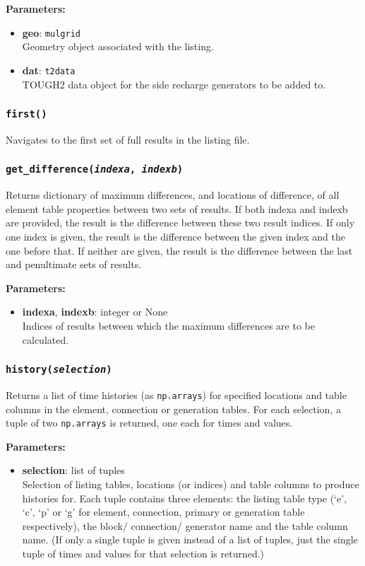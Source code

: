 \textbf{Parameters:}
\begin{itemize}
\item \textbf{geo}: \texttt{mulgrid}\\
  Geometry object associated with the listing.
\item \textbf{dat}: \texttt{t2data}\\
  TOUGH2 data object for the side recharge generators to be added to.
\end{itemize}

\subsubsection{\texttt{first()}}

Navigates to the first set of full results in the listing file.

\subsubsection{\texttt{get\_difference(\emph{indexa}, \emph{indexb})}}

Returns dictionary of maximum differences, and locations of difference, of all element table properties between two sets of results.  If both indexa and indexb are provided, the result is the difference between these two result indices.  If only one index is given, the result is the difference between the given index and the one before that.  If neither are given, the result is the difference between the last and penultimate sets of results.

\textbf{Parameters:}
\begin{itemize}
\item \textbf{indexa}, \textbf{indexb}: integer or None\\
  Indices of results between which the maximum differences are to be calculated.
\end{itemize}

\subsubsection{\texttt{history(\emph{selection})}}

Returns a list of time histories (as \texttt{np.arrays}) for specified locations and table columns in the element, connection or generation tables.  For each selection, a tuple of two \texttt{np.arrays} is returned, one each for times and values.

\textbf{Parameters:}
\begin{itemize}
\item \textbf{selection}: list of tuples\\
  Selection of listing tables, locations (or indices) and table columns to produce histories for.  Each tuple contains three elements: the listing table type (`e', `c', `p' or `g' for element, connection, primary or generation table respectively), the block/ connection/ generator name and the table column name.  (If only a single tuple is given instead of a list of tuples, just the single tuple of times and values for that selection is returned.)
\end{itemize}

